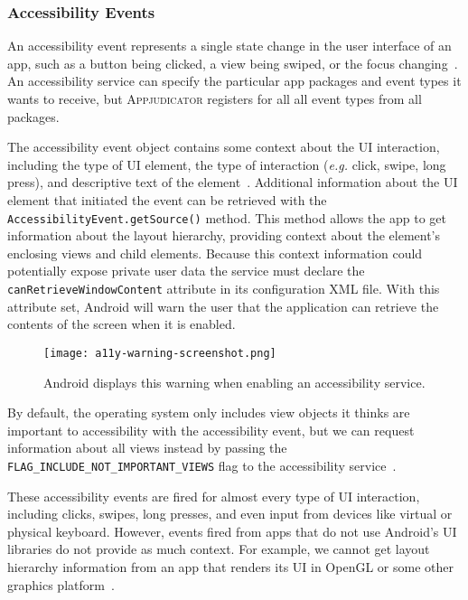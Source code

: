 \subsubsection{Accessibility Events}
\label{sec:accessibility-events}

An accessibility event represents a single state change in the user interface of
an app, such as a button being clicked, a view being swiped, or the focus
changing~\cite{accessibilityserviceguide}. An accessibility service can specify
the particular app packages and event types it wants to receive, but
\textsc{Appjudicator} registers for all all event types from all packages.

The accessibility event object contains some context about the UI interaction,
including the type of UI element, the type of interaction (\textit{e.g.} click,
swipe, long press), and descriptive text of the
element~\cite{accessibilityserviceguide}. Additional information about the UI
element that initiated the event can be retrieved with the
\texttt{AccessibilityEvent.getSource()} method. This method allows the app to
get information about the layout hierarchy, providing context about the
element's enclosing views and child elements. Because this context information
could potentially expose private user data the service must declare the
\texttt{canRetrieveWindowContent} attribute in its configuration XML file. With
this attribute set, Android will warn the user that the application can retrieve
the contents of the screen when it is enabled.

\begin{wrapfigure}{L}{0.4\textwidth}
	\centering
	\texttt{[image: a11y-warning-screenshot.png]}
	\caption{Android displays this warning when enabling an accessibility
		service.}
	\label{fig:a11y-warning}
\end{wrapfigure}

By default, the operating system only includes view objects it thinks are
important to accessibility with the accessibility event, but we can request
information about all views instead by passing the 
\texttt{FLAG\_INCLUDE\_NOT\_IMPORTANT\_VIEWS} flag to the accessibility
service~\cite{accessibilityserviceguide}.

These accessibility events are fired for almost every type of UI interaction,
including clicks, swipes, long presses, and even input from devices like virtual
or physical keyboard. However, events fired from apps that do not use Android's
UI libraries do not provide as much context. For example, we cannot get layout
hierarchy information from an app that renders its UI in OpenGL or some other
graphics platform~\cite{accessibilityserviceguide}.

